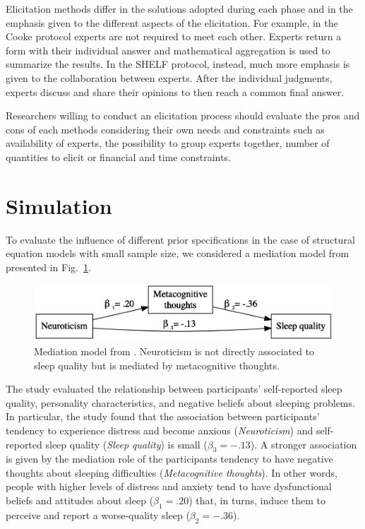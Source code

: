 \documentclass[graybox]{svmult}
\begin{document}
Elicitation methods differ in the solutions adopted during each phase and in the emphasis given to the different aspects of the elicitation. For example, in the Cooke protocol experts are not required to meet each other. Experts return a form with their individual answer and mathematical aggregation is used to summarize the results. In the SHELF protocol, instead, much more emphasis is given to the collaboration between experts. After the  individual judgments, experts discuss and share their opinions to then reach a common final answer.

Researchers willing to conduct an elicitation process should evaluate the pros and cons of each methods considering their own needs and constraints such as availability of experts, the possibility to group experts together, number of quantities to elicit or financial and time constraints.

\section{Simulation}
\label{sec:simulation}

To evaluate the influence of different prior specifications in the case of structural equation models with small sample size, we considered a mediation model from \cite{sellaPersonalityTraitsSleep2020}  presented in Fig.~\ref{fig:example_model}. 
\begin{figure}[b]
	\sidecaption
	\includegraphics[width = .64\textwidth]{figure/Plot_example_model}
	\caption{Mediation model from \cite{sellaPersonalityTraitsSleep2020}. Neuroticism is not directly associated to sleep quality but is mediated by metacognitive thoughts.}
	\label{fig:example_model}
\end{figure}
The study evaluated the relationship between participants' self-reported sleep quality, personality characteristics, and negative beliefs about sleeping problems. In particular, the study found that the association between participants' tendency to experience distress and become anxious (\emph{Neuroticism}) and self-reported sleep quality (\emph{Sleep quality}) is small ($\beta_3=-.13$).  A stronger association is given  by the mediation role of the participants tendency to have negative thoughts about sleeping difficulties (\emph{Metacognitive thoughts}). In other words, people with higher levels of distress and anxiety tend to have dysfunctional beliefs and attitudes about sleep ($\beta_1=.20$) that, in turns, induce them to perceive and report a worse-quality sleep ($\beta_2=-.36$).
\end{document}
